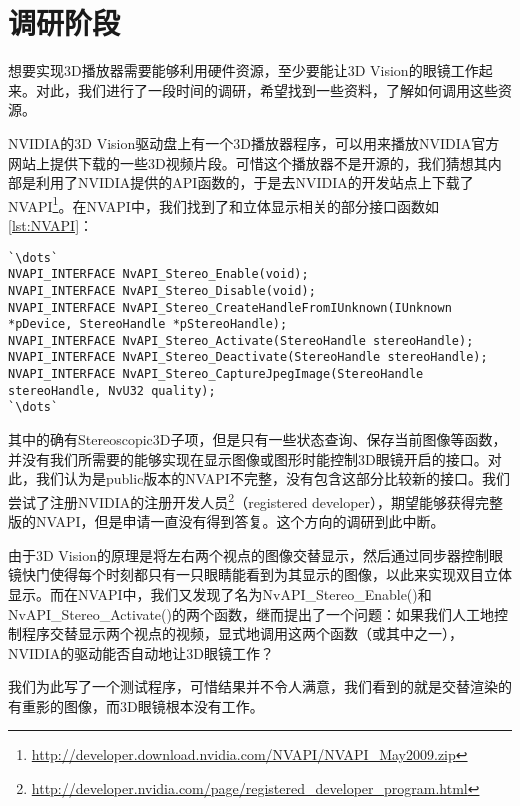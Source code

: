 \section{调研阶段}
\label{sec:3Dplayersurvey}

想要实现3D播放器需要能够利用硬件资源，至少要能让3D Vision的眼镜工作起来。对此，我们进行了一段时间的调研，希望找到一些资料，了解如何调用这些资源。


NVIDIA的3D Vision驱动盘上有一个3D播放器程序，可以用来播放NVIDIA官方网站上提供下载的一些3D视频片段。可惜这个播放器不是开源的，我们猜想其内部是利用了NVIDIA提供的API函数的，于是去NVIDIA的开发站点上下载了NVAPI\footnote{\url{http://developer.download.nvidia.com/NVAPI/NVAPI_May2009.zip}}。在NVAPI中，我们找到了和立体显示相关的部分接口函数如\autoref{lst:NVAPI}：

\begin{lstlisting}[caption = {NVAPI中立体显示的部分函数}, label = lst:NVAPI]
`\dots`
NVAPI_INTERFACE NvAPI_Stereo_Enable(void);
NVAPI_INTERFACE NvAPI_Stereo_Disable(void);
NVAPI_INTERFACE NvAPI_Stereo_CreateHandleFromIUnknown(IUnknown *pDevice, StereoHandle *pStereoHandle);
NVAPI_INTERFACE NvAPI_Stereo_Activate(StereoHandle stereoHandle);
NVAPI_INTERFACE NvAPI_Stereo_Deactivate(StereoHandle stereoHandle);
NVAPI_INTERFACE NvAPI_Stereo_CaptureJpegImage(StereoHandle stereoHandle, NvU32 quality);
`\dots`
\end{lstlisting}

其中的确有Stereoscopic3D子项，但是只有一些状态查询、保存当前图像等函数，并没有我们所需要的能够实现在显示图像或图形时能控制3D眼镜开启的接口。对此，我们认为是public版本的NVAPI不完整，没有包含这部分比较新的接口。我们尝试了注册NVIDIA的注册开发人员\footnote{\url{http://developer.nvidia.com/page/registered_developer_program.html}}（registered developer），期望能够获得完整版的NVAPI，但是申请一直没有得到答复。这个方向的调研到此中断。


由于3D Vision的原理是将左右两个视点的图像交替显示，然后通过同步器控制眼镜快门使得每个时刻都只有一只眼睛能看到为其显示的图像，以此来实现双目立体显示。而在NVAPI中，我们又发现了名为NvAPI\_Stereo\_Enable()和NvAPI\_Stereo\_Activate()的两个函数，继而提出了一个问题：如果我们人工地控制程序交替显示两个视点的视频，显式地调用这两个函数（或其中之一），NVIDIA的驱动能否自动地让3D眼镜工作？

我们为此写了一个测试程序，可惜结果并不令人满意，我们看到的就是交替渲染的有重影的图像，而3D眼镜根本没有工作。

